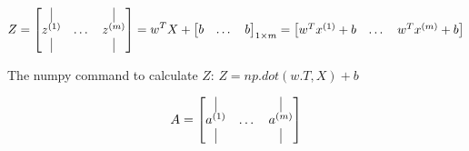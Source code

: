 $$
Z =
\begin{bmatrix}
\vline &  & \vline \\
z^{(1)} & \dots  & z^{(m)} \\
\vline &  & \vline \\
\end{bmatrix}
= 
w^TX + \begin{bmatrix}
b & \dots & b
\end{bmatrix}_{1\times m}
= 
\begin{bmatrix}
w^Tx^{(1)}+b & \dots & w^Tx^{(m)}+b 
\end{bmatrix}
$$

The numpy command to calculate $Z$: $Z = np.dot(w.T, X) + b$

$$
A = 
\begin{bmatrix}
\vline &  & \vline \\
a^{(1)} & \dots  & a^{(m)} \\
\vline &  & \vline \\
\end{bmatrix}
$$

